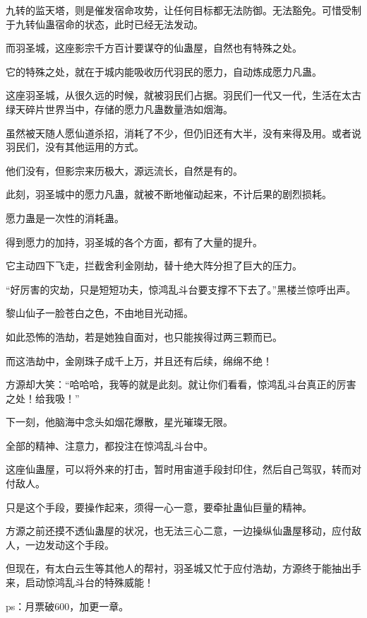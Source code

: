 \begin{this_body}
九转的监天塔，则是催发宿命攻势，让任何目标都无法防御。无法豁免。可惜受制于九转仙蛊宿命的状态，此时已经无法发动。

而羽圣城，这座影宗千方百计要谋夺的仙蛊屋，自然也有特殊之处。

它的特殊之处，就在于城内能吸收历代羽民的愿力，自动炼成愿力凡蛊。

这座羽圣城，从很久远的时候，就被羽民们占据。羽民们一代又一代，生活在太古绿天碎片世界当中，存储的愿力凡蛊数量浩如烟海。

虽然被天随人愿仙道杀招，消耗了不少，但仍旧还有大半，没有来得及用。或者说羽民们，没有其他运用的方式。

他们没有，但影宗来历极大，源远流长，自然是有的。

此刻，羽圣城中的愿力凡蛊，就被不断地催动起来，不计后果的剧烈损耗。

愿力蛊是一次性的消耗蛊。

得到愿力的加持，羽圣城的各个方面，都有了大量的提升。

它主动四下飞走，拦截舍利金刚劫，替十绝大阵分担了巨大的压力。

“好厉害的灾劫，只是短短功夫，惊鸿乱斗台要支撑不下去了。”黑楼兰惊呼出声。

黎山仙子一脸苍白之色，不由地目光动摇。

如此恐怖的浩劫，若是她独自面对，也只能挨得过两三颗而已。

而这浩劫中，金刚珠子成千上万，并且还有后续，绵绵不绝！

方源却大笑：“哈哈哈，我等的就是此刻。就让你们看看，惊鸿乱斗台真正的厉害之处！给我吸！”

下一刻，他脑海中念头如烟花爆散，星光璀璨无限。

全部的精神、注意力，都投注在惊鸿乱斗台中。

这座仙蛊屋，可以将外来的打击，暂时用宙道手段封印住，然后自己驾驭，转而对付敌人。

只是这个手段，要操作起来，须得一心一意，要牵扯蛊仙巨量的精神。

方源之前还摸不透仙蛊屋的状况，也无法三心二意，一边操纵仙蛊屋移动，应付敌人，一边发动这个手段。

但现在，有太白云生等其他人的帮衬，羽圣城又忙于应付浩劫，方源终于能抽出手来，启动惊鸿乱斗台的特殊威能！

ps：月票破600，加更一章。

\end{this_body}

